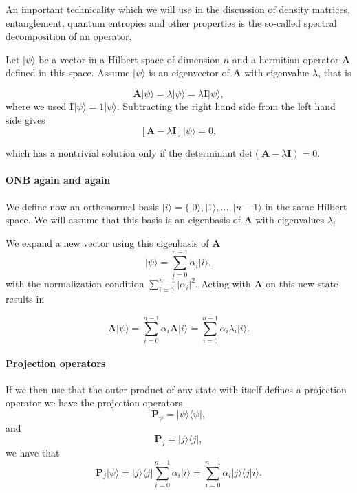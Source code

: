 An important technicality which we will use in the discussion of
density matrices, entanglement, quantum entropies and other properties
is the so-called spectral decomposition of an operator.

Let $\vert \psi\rangle$ be a vector in a Hilbert space of dimension $n$ and a hermitian operator $\bm{A}$ defined in this
space. Assume $\vert \psi\rangle$ is an eigenvector of $\bm{A}$ with eigenvalue $\lambda$, that is

\[
\bm{A}\vert \psi\rangle = \lambda\vert \psi\rangle = \lambda \bm{I}\vert \psi \rangle,
\]
where we used $\bm{I}\vert \psi \rangle = 1 \vert \psi \rangle$.
Subtracting the right hand side from the left hand side gives
\[
\left[\bm{A}-\lambda \bm{I}\right]\vert \psi \rangle=0,
\]

which has a nontrivial solution only if the determinant
$\mathrm{det}(\bm{A}-\lambda\bm{I})=0$.


\paragraph{ONB again and again}

We define now an orthonormal basis $\vert i \rangle =\{\vert 0
\rangle, \vert 1\rangle, \dots, \vert n-1\rangle$ in the same Hilbert
space. We will assume that this basis is an eigenbasis of $\bm{A}$ with eigenvalues $\lambda_i$

We expand a new vector using this eigenbasis of $\bm{A}$
\[
\vert \psi \rangle = \sum_{i=0}^{n-1}\alpha_i\vert i\rangle,
\]
with the normalization condition $\sum_{i=0}^{n-1}\vert \alpha_i\vert^2$.
Acting with $\bm{A}$ on this new state results in

\[
\bm{A}\vert \psi \rangle = \sum_{i=0}^{n-1}\alpha_i\bm{A}\vert i\rangle=\sum_{i=0}^{n-1}\alpha_i\lambda_i\vert i\rangle.
\]


\paragraph{Projection operators}

If we then use that the outer product of any state with itself defines a projection operator we have the projection operators
\[
\bm{P}_{\psi} = \vert \psi\rangle\langle \psi\vert,
\]
and
\[
\bm{P}_{j} = \vert j\rangle\langle j\vert,
\]
we have that 
\[
\bm{P}_{j}\vert \psi\rangle=\vert j\rangle\langle j\vert\sum_{i=0}^{n-1}\alpha_i\vert i\rangle=\sum_{i=0}^{n-1}\alpha_i\vert j\rangle\langle j\vert i\rangle.
\]


